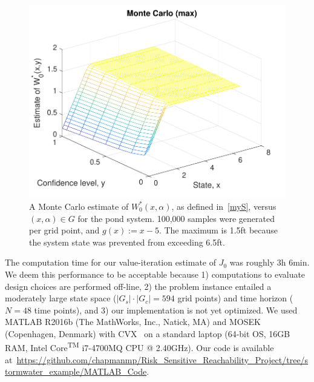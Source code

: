 \documentclass[letterpaper, 10 pt, conference]{ieeeconf}  %
\begin{document}
\begin{figure}[thpb]
      \centering
      \includegraphics[scale=0.5]{monte_carlo_max_sept112018.pdf}
      \caption{A Monte Carlo estimate of $W_0^*(x,\alpha)$, as defined in~\eqref{myS}, versus $(x, \alpha) \in G$ for the pond system.
	  100,000 samples were generated per grid point, and $g(x) := x - 5$. 
	  The maximum is 1.5ft because the system state was prevented from exceeding 6.5ft.}
      \label{W0mc}
\end{figure}

The computation time for our value-iteration estimate of $J_0$ was roughly 3h 6min.
We deem this performance to be acceptable because  
1) computations to evaluate design choices are performed off-line, 
2) the problem instance entailed a moderately large state space ($|G_s|\cdot|G_c| = 594$ grid points) and time horizon ($N = 48$ time points),
and 3) our implementation is not yet optimized.
We used MATLAB R2016b (The MathWorks, Inc., Natick, MA) and MOSEK (Copenhagen, Denmark) with CVX~\cite{grant2008cvx} on a
standard laptop (64-bit OS, 16GB RAM, Intel\textsuperscript{\textregistered} Core\textsuperscript{TM} i7-4700MQ CPU @ 2.40GHz).
Our code is available at~\url{https://github.com/chapmanmp/Risk_Sensitive_Reachability_Project/tree/stormwater_example/MATLAB_Code}.
\end{document}
